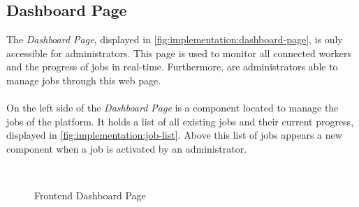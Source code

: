 \subsection{Dashboard Page}
\label{subsec:implementation:dashboard-page}
The \emph{Dashboard Page}, displayed in \autoref{fig:implementation:dashboard-page}, is only accessible for administrators. This page is used to monitor all connected workers and the progress of jobs in real-time. Furthermore, are administrators able to manage jobs through this web page.
\\~\\
On the left side of the \emph{Dashboard Page} is a component located to manage the jobs of the platform. It holds a list of all existing jobs and their current progress, displayed in \autoref{fig:implementation:job-list}. Above this list of jobs appears a new component when a job is activated by an administrator.
\begin{figure}[htbp]
    \myfloatalign
     \\
    \caption{Frontend Dashboard Page}
    \label{fig:implementation:dashboard-page}
\end{figure}
